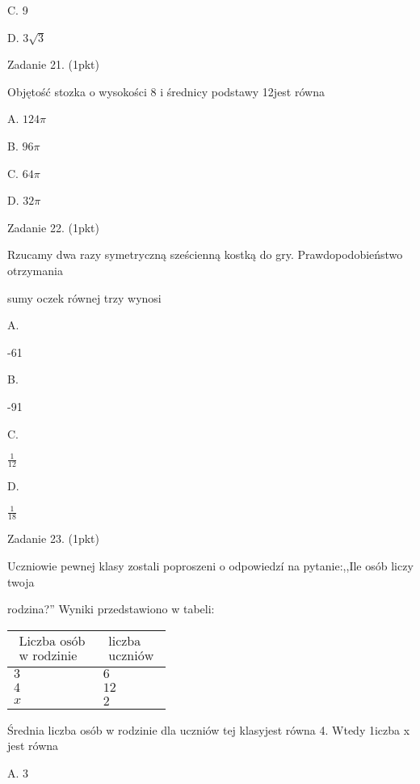 \documentclass[a4paper,12pt]{article}
\begin{document}
C. 9

D. $3\sqrt{3}$

Zadanie 21. (1pkt)

Objętość stozka o wysokości 8 i średnicy podstawy 12jest równa

A. $ 124\pi$

B. $ 96\pi$

C. $ 64\pi$

D. $ 32\pi$

Zadanie 22. (1pkt)

Rzucamy dwa razy symetryczną sześcienną kostką do gry. Prawdopodobieństwo otrzymania

sumy oczek równej trzy wynosi

A.

-61

B.

-91

C.

$\displaystyle \frac{1}{12}$

D.

$\displaystyle \frac{1}{18}$

Zadanie 23. (1pkt)

Uczniowie pewnej klasy zostali poproszeni o odpowiedzí na pytanie:,,Ile osób liczy twoja

rodzina?'' Wyniki przedstawiono w tabeli:
\begin{center}
\begin{tabular}{|l|l|}
\hline
\multicolumn{1}{|l|}{$\begin{array}{l}\mbox{Liczba osób}	\\	\mbox{w rodzinie}	\end{array}$}&	\multicolumn{1}{|l|}{$\begin{array}{l}\mbox{liczba}	\\	\mbox{uczniów}	\end{array}$}	\\
\hline
\multicolumn{1}{|l|}{ $3$}&	\multicolumn{1}{|l|}{ $6$}	\\
\hline
\multicolumn{1}{|l|}{ $4$}&	\multicolumn{1}{|l|}{ $12$}	\\
\hline
\multicolumn{1}{|l|}{ $x$}&	\multicolumn{1}{|l|}{ $2$}	\\
\hline
\end{tabular}

\end{center}
Średnia liczba osób w rodzinie dla uczniów tej klasyjest równa 4. Wtedy 1iczba x jest równa

A. 3
\end{document}
